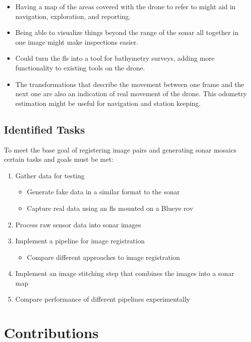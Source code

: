 \begin{itemize}
    \item Having a map of the areas covered with the drone to refer to might aid in navigation, exploration, and reporting.
    \item Being able to visualize things beyond the range of the \acrshort{sonar} all together in one image might make inspections easier.
    \item Could turn the \acrshort{fls} into a tool for bathymetry surveys, adding more functionality to existing tools on the drone.
    \item The transformations that describe the movement between one frame and the next one are also an indication of real movement of the drone. This odometry estimation might be useful for navigation and station keeping.
\end{itemize}

\subsection{Identified Tasks}
To meet the base goal of registering image pairs and generating \acrshort{sonar} mosaics certain tasks and goals must be met:

\begin{enumerate}
    \item Gather data for testing
        \begin{itemize}
            \item Generate fake data in a similar format to the \acrshort{sonar}
            \item Capture real data using an \acrshort{fls} mounted on a Blueye \acrshort{rov}
        \end{itemize}
    \item Process raw sensor data into \acrshort{sonar} images
    \item Implement a pipeline for image registration
        \begin{itemize}
            \item Compare different approaches to image registration
        \end{itemize}
    \item Implement an image stitching step that combines the images into a \acrshort{sonar} map
    \item Compare performance of different pipelines experimentally
\end{enumerate}

\section{Contributions}

